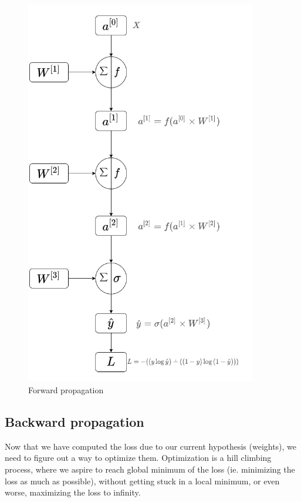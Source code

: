 \begin{figure}
    \centering
    \includegraphics[width=0.9\textwidth]{images/forward_prop_3.png}
    \caption{Forward propagation}
    \label{fig:forward_prop_3}
\end{figure}

\subsection{Backward propagation}
Now that we have computed the loss due to our current hypothesis (weights), we need to figure out a way to optimize them. Optimization is a hill climbing process, where we aspire to reach global minimum of the loss (ie. minimizing the loss as much as possible), without getting stuck in a local minimum, or even worse, maximizing the loss to infinity.


